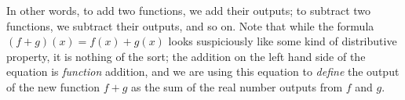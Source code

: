 In other words, to add two functions, we add their outputs;  to subtract two functions, we subtract their outputs, and so on.  Note that while the formula $(f+g)(x) = f(x) + g(x)$ looks suspiciously like some kind of distributive property, it is nothing of the sort;  the addition on the left hand side of the equation is \textit{function} addition, and we are using this equation to \textit{define} the output of the new function $f+g$ as the sum of the real number outputs from $f$ and $g$.

\medskip

